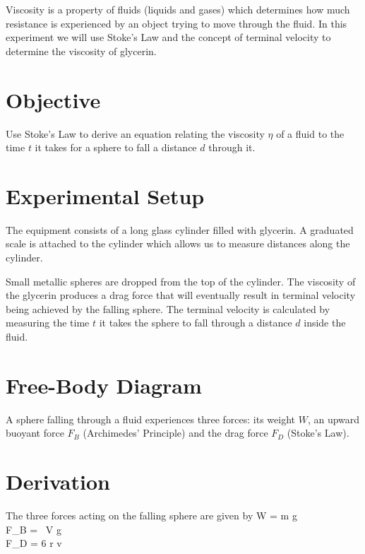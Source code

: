Viscosity is a property of fluids (liquids and gases) which determines how much resistance is experienced by an object trying to move through the fluid. In this experiment we will use Stoke's Law and the concept of terminal velocity to determine the viscosity of glycerin.

\section*{Objective}

   Use Stoke's Law to derive an equation relating the viscosity $\eta$ of a fluid to the time $t$ it takes for a sphere to fall a distance $d$ through it.

\section*{Experimental Setup}

   The equipment consists of a long glass cylinder filled with glycerin. A graduated scale is attached to the cylinder which allows us to measure distances along the cylinder.
   
   Small metallic spheres are dropped from the top of the cylinder. The viscosity of the glycerin produces a drag force that will eventually result in terminal velocity being achieved by the falling sphere. The terminal velocity is calculated by measuring the time $t$ it takes the sphere to fall through a distance $d$ inside the fluid.

   \diag

\section*{Free-Body Diagram}

   A sphere falling through a fluid experiences three forces: its weight $W$, an upward buoyant force $F_B$ (Archimedes' Principle) and the drag force $F_D$ (Stoke's Law).

   \diag

\section*{Derivation}

   The three forces acting on the falling sphere are given by
   \beqc
      W = m g\\
      F_B = \rho \, V g\\
      F_D = 6 \pi \eta r v\\
   \eeqc

